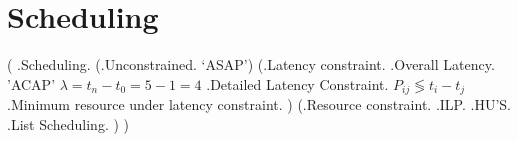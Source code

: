 \section{Scheduling}
\begin{parsetree}
    ( .Scheduling. 
        (.Unconstrained.  `ASAP')
        (.Latency constraint.  
        	.Overall Latency.	'ACAP' $ \lambda=t_{n}-t_{0} = 5-1=4 $
        	.Detailed Latency Constraint.	$ P_{ij} \lessgtr t_{i}-t_{j} $
        	.Minimum resource under latency constraint.
        )
        (.Resource constraint.  
        	.ILP.
        	.HU'S.
        	.List Scheduling.
        )
    )
\end{parsetree}	